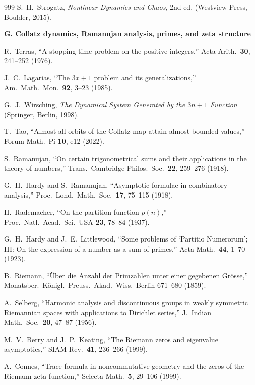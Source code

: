 \begin{thebibliography}{999}
S.~H.~Strogatz,
\emph{Nonlinear Dynamics and Chaos}, 2nd ed.
(Westview Press, Boulder, 2015).

\item[]\textbf{G. Collatz dynamics, Ramanujan analysis, primes, and zeta structure}

R.~Terras,
``A stopping time problem on the positive integers,''
Acta Arith.\ \textbf{30}, 241--252 (1976).

J.~C.~Lagarias,
``The $3x+1$ problem and its generalizations,''
Am.\ Math.\ Mon.\ \textbf{92}, 3--23 (1985).

G.~J.~Wirsching,
\emph{The Dynamical System Generated by the $3n+1$ Function}
(Springer, Berlin, 1998).

T.~Tao,
``Almost all orbits of the Collatz map attain almost bounded values,''
Forum Math.\ Pi \textbf{10}, e12 (2022).

S.~Ramanujan,
``On certain trigonometrical sums and their applications in the theory of
numbers,'' Trans.\ Cambridge Philos.\ Soc.\ \textbf{22}, 259--276 (1918).

G.~H.~Hardy and S.~Ramanujan,
``Asymptotic formulae in combinatory analysis,''
Proc.\ Lond.\ Math.\ Soc.\ \textbf{17}, 75--115 (1918).

H.~Rademacher,
``On the partition function $p(n)$,''
Proc.\ Natl.\ Acad.\ Sci.\ USA \textbf{23}, 78--84 (1937).

G.~H.~Hardy and J.~E.~Littlewood,
``Some problems of `Partitio Numerorum'; III: On the expression of a number as
a sum of primes,'' Acta Math.\ \textbf{44}, 1--70 (1923).

B.~Riemann,
``\"Uber die Anzahl der Primzahlen unter einer gegebenen Gr\"osse,''
Monatsber.\ K\"onigl.\ Preuss.\ Akad.\ Wiss.\ Berlin 671--680 (1859).

A.~Selberg,
``Harmonic analysis and discontinuous groups in weakly symmetric Riemannian
spaces with applications to Dirichlet series,''
J.\ Indian Math.\ Soc.\ \textbf{20}, 47--87 (1956).

M.~V.~Berry and J.~P.~Keating,
``The Riemann zeros and eigenvalue asymptotics,''
SIAM Rev.\ \textbf{41}, 236--266 (1999).

A.~Connes,
``Trace formula in noncommutative geometry and the zeros of the Riemann zeta
function,'' Selecta Math.\ \textbf{5}, 29--106 (1999).


\end{thebibliography}

